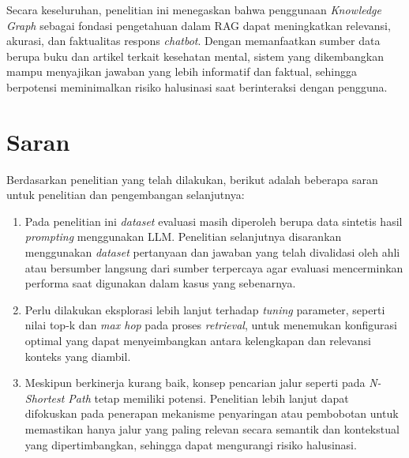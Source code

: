 Secara keseluruhan, penelitian ini menegaskan bahwa penggunaan \textit{Knowledge Graph} sebagai fondasi pengetahuan dalam RAG dapat meningkatkan relevansi, akurasi, dan faktualitas respons \textit{chatbot}.
Dengan memanfaatkan sumber data berupa buku dan artikel terkait kesehatan mental, sistem yang dikembangkan mampu menyajikan jawaban yang lebih informatif dan faktual, sehingga berpotensi meminimalkan risiko halusinasi saat berinteraksi dengan pengguna.

\section{Saran}
Berdasarkan penelitian yang telah dilakukan, berikut adalah beberapa saran untuk penelitian dan pengembangan selanjutnya:

\begin{enumerate}
      \item Pada penelitian ini \textit{dataset} evaluasi masih diperoleh berupa data sintetis hasil \textit{prompting} menggunakan LLM.
            Penelitian selanjutnya disarankan menggunakan \textit{dataset} pertanyaan dan jawaban yang telah divalidasi oleh ahli atau bersumber langsung dari sumber terpercaya agar evaluasi mencerminkan performa saat digunakan dalam kasus yang sebenarnya.

      \item Perlu dilakukan eksplorasi lebih lanjut terhadap \textit{tuning} parameter, seperti nilai top-k dan \textit{max hop} pada proses \textit{retrieval}, untuk menemukan konfigurasi optimal yang dapat menyeimbangkan antara kelengkapan dan relevansi konteks yang diambil.

      \item Meskipun berkinerja kurang baik, konsep pencarian jalur seperti pada \textit{N-Shortest Path} tetap memiliki potensi.
            Penelitian lebih lanjut dapat difokuskan pada penerapan mekanisme penyaringan atau pembobotan untuk memastikan hanya jalur yang paling relevan secara semantik dan kontekstual yang dipertimbangkan, sehingga dapat mengurangi risiko halusinasi.

\end{enumerate}